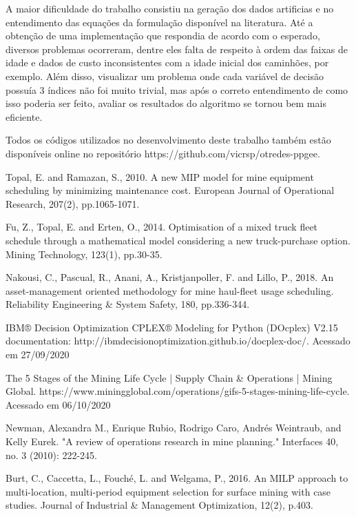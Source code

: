 \documentclass[conference]{IEEEtran}
\begin{document}
A maior dificuldade do trabalho consistiu na geração dos dados artificias e no entendimento das equações da formulação disponível na literatura. Até a obtenção de uma implementação que respondia de acordo com o esperado, diversos problemas ocorreram, dentre eles falta de respeito à ordem das faixas de idade e dados de custo inconsistentes com a idade inicial dos caminhões, por exemplo. Além disso, visualizar um problema onde cada variável de decisão possuía 3 índices não foi muito trivial, mas após o correto entendimento de como isso poderia ser feito, avaliar os resultados do algoritmo se tornou bem mais eficiente.

Todos os códigos utilizados no desenvolvimento deste trabalho também estão disponíveis online no repositório https://github.com/vicrsp/otredes-ppgee.


\begin{thebibliography}{1}

Topal, E. and Ramazan, S., 2010. A new MIP model for mine equipment scheduling by minimizing maintenance cost. European Journal of Operational Research, 207(2), pp.1065-1071.

Fu, Z., Topal, E. and Erten, O., 2014. Optimisation of a mixed truck fleet schedule through a mathematical model considering a new truck-purchase option. Mining Technology, 123(1), pp.30-35.

Nakousi, C., Pascual, R., Anani, A., Kristjanpoller, F. and Lillo, P., 2018. An asset-management oriented methodology for mine haul-fleet usage scheduling. Reliability Engineering \& System Safety, 180, pp.336-344.

IBM® Decision Optimization CPLEX® Modeling for Python (DOcplex) V2.15 documentation: http://ibmdecisionoptimization.github.io/docplex-doc/. Acessado em  27/09/2020

The 5 Stages of the Mining Life Cycle | Supply Chain \& Operations | Mining Global. https://www.miningglobal.com/operations/gifs-5-stages-mining-life-cycle. Acessado em 06/10/2020

Newman, Alexandra M., Enrique Rubio, Rodrigo Caro, Andrés Weintraub, and Kelly Eurek. "A
review of operations research in mine planning." Interfaces 40, no. 3 (2010): 222-245.

Burt, C., Caccetta, L., Fouché, L. and Welgama, P., 2016. An MILP approach to multi-location, multi-period equipment selection for surface mining with case studies. Journal of Industrial \& Management Optimization, 12(2), p.403.


\end{thebibliography}
	
	
\end{document}
